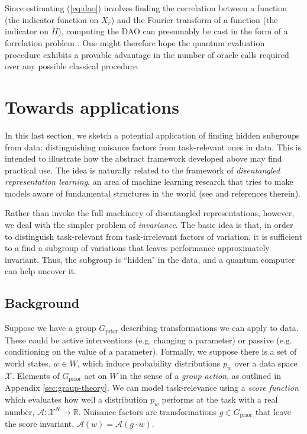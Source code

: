 \documentclass[aps, pre,reprint,nofootinbib,citeautoscript,floatfix]{revtex4-1}
\begin{document}
Since estimating (\ref{eq:dao}) involves finding the correlation between a function (the indicator function on $X_r$) and the Fourier transform of a function (the indicator on $\tilde{H}$), computing the DAO can presumably be cast in the form of a forrelation problem \cite{aaronson2009bqp, aaronson2014forrelation}. One might therefore hope the quantum evaluation procedure exhibits a provable advantage in the number of oracle calls required over any possible classical procedure.

\section{Towards applications}
\label{sec:dao-deep-learning}

In this last section, we sketch a potential application of finding hidden subgroups from data: distinguishing nuisance factors from task-relevant ones in data. 
This is intended to illustrate how the abstract framework developed above may find practical use.
The idea is naturally related to the framework of \textit{disentangled representation learning}, an area of machine learning research that tries to make models aware of fundamental structures in the world (see \cite{bengio2014representation, higgins2018definition, achille} and references therein). 


Rather than invoke the full machinery of disentangled representations, however, we deal with the simpler problem of \emph{invariance}.
The basic idea is that, in order to distinguish task-relevant from task-irrelevant factors of variation, it is sufficient to a find a subgroup of variations that leaves performance approximately invariant.
Thus, the subgroup is ``hidden" in the data, and a quantum computer can help uncover it.

\subsection{Background}

Suppose we have a group $G_\text{prior}$ describing transformations we can apply to data. These could be active interventions (e.g. changing a parameter) or passive (e.g. conditioning on the value of a parameter).
Formally, we suppose there is a set of world states, $w \in W$, which induce probability distributions $p_w$ over a data space $\mathcal{X}$. Elements of $G_\text{prior}$ act on $W$ in the sense of a \emph{group action}, as outlined in Appendix \ref{sec:group-theory}.
We can model task-relevance using a \emph{score function} which evaluates how well a distribution $p_w$ performs at the task with a real number, $\mathcal{A}: \mathcal{X}^N \to \mathbb{R}$. Nuisance factors are transformations $g\in G_\text{prior}$ that leave the score invariant, $\mathcal{A}(w) = \mathcal{A}(g\cdot w)$.
\end{document}
